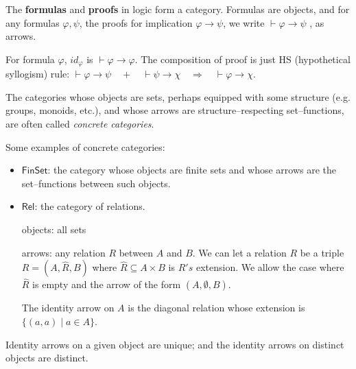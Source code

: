 \begin{example}
	The \textbf{formulas} and \textbf{proofs} in logic form a category.
	Formulas are objects, 
	and for any formulas $\varphi,\psi$, 
	the proofs for implication $\varphi \to \psi$, 
	we write $\vdash \varphi \to \psi$ , as arrows.

	For formula $\varphi$, 
	$id_\varphi$ is $\vdash \varphi \to \varphi$. 
	The composition of proof is just HS (hypothetical syllogism) rule:
	$ \vdash \varphi \to \psi 
		\quad +\quad 
		\vdash  \psi \to \chi 
		\quad
		\Rightarrow \quad \vdash \varphi \to \chi.
	$ 
\end{example}


The categories whose objects are sets, 
perhaps equipped with some structure (e.g. groups, monoids, etc.), 
and whose arrows are structure--respecting set--functions, 
are often called \textit{concrete categories}.  
\label{def: concrete-categories}


\begin{example}
    Some examples of concrete categories:
    
    \begin{itemize}[itemsep=5pt,parsep=5pt,leftmargin=3em,topsep=5pt]
        \item 
        $\mathsf{FinSet}$: the category whose objects are finite sets and whose arrows are the set--functions between such objects.
        

        \item $\mathsf{Rel}$: the category of relations.
        
        objects: all sets 

        arrows: any relation $R$ between $A$ and $B$. 
        We can let a relation $R$ be a triple $R = (A,\hat{R},B)$ where $\hat{R} \subseteq A \times B$ is $R's$ extension. 
        We allow the case where $\hat{R}$ is empty and the arrow of the form $(A,\emptyset,B)$.

        The identity arrow on $A$ is the diagonal relation whose extension is $\{(a,a) \mid a \in A\}$.
    \end{itemize}
\end{example}





\begin{thm}
	Identity arrows on a given object are unique; and the identity arrows on distinct objects are distinct.
\end{thm}




